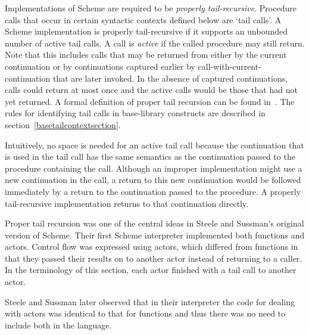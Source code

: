 Implementations of Scheme are required to be
{\em properly tail-recursive}.
Procedure calls that occur in certain syntactic
contexts defined below are `tail calls'.  A Scheme implementation is
properly tail-recursive if it supports an unbounded number of active
tail calls.  A call is {\em active} if the called procedure may still
return.  Note that this includes calls that may be returned from either
by the current continuation or by continuations captured earlier by
{\cf call-with-current-continuation} that are later invoked.
In the absence of captured continuations, calls could
return at most once and the active calls would be those that had not
yet returned.
A formal definition of proper tail recursion can be found
in~\cite{propertailrecursion}.  The rules for identifying tail calls
in base-library constructs are described in
section~\ref{basetailcontextsection}.

\begin{rationale}

Intuitively, no space is needed for an active tail call because the
continuation that is used in the tail call has the same semantics as the
continuation passed to the procedure containing the call.  Although an improper
implementation might use a new continuation in the call, a return
to this new continuation would be followed immediately by a return
to the continuation passed to the procedure.  A properly tail-recursive
implementation returns to that continuation directly.

Proper tail recursion was one of the central ideas in Steele and
Sussman's original version of Scheme.  Their first Scheme interpreter
implemented both functions and actors.  Control flow was expressed using
actors, which differed from functions in that they passed their results
on to another actor instead of returning to a caller.  In the terminology
of this section, each actor finished with a tail call to another actor.

Steele and Sussman later observed that in their interpreter the code
for dealing with actors was identical to that for functions and thus
there was no need to include both in the language.

\end{rationale}

